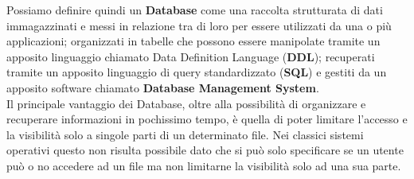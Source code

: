 Possiamo definire quindi un \textbf{Database} come una raccolta strutturata di
dati immagazzinati e messi in relazione tra di loro per essere utilizzati da una
o più applicazioni; organizzati in tabelle che possono essere manipolate tramite
un apposito linguaggio chiamato Data Definition Language (\textbf{DDL}); recuperati
tramite un apposito linguaggio di query standardizzato (\textbf{SQL}) e gestiti
da un apposito software chiamato \textbf{Database Management System}.\\

Il principale vantaggio dei Database, oltre alla possibilità di organizzare e
recuperare informazioni in pochissimo tempo, è quella di poter limitare l'accesso
e la visibilità solo a singole parti di un determinato file. Nei classici sistemi
operativi questo non risulta possibile dato che si può solo specificare se un
utente può o no accedere ad un file ma non limitarne la visibilità solo ad una
sua parte.